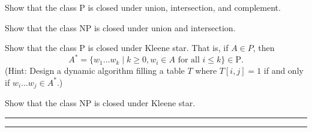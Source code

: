 \documentclass[a4paper,12pt]{amsart}
\begin{document}
    
    
    \bigskip\begin{problem}
    Show that the class P is closed under union, intersection, and complement.
    \end{problem}
    
    
    \bigskip\begin{problem}
    Show that the class NP is closed under union and intersection.
    \end{problem}
    
    \bigskip\begin{problem}
    Show that the class P is closed under Kleene star. That is, if $A\in P$, then
    $$
    A^* = \{w_1\dots w_k\mid k\geq 0, w_i\in A\text { for all }i\leq k\} \in \text{P}.
    $$
    (Hint: Design a dynamic algorithm filling a table $T$ where $T[i,j]=1$ if and only if $w_i\dots w_j\in A^*$.) 
    \end{problem}
    
    \bigskip\begin{problem}
    Show that the class NP is closed under Kleene star.
    \end{problem}
    
    \bigskip\hrule\hrule
    
    
    
\end{document}
